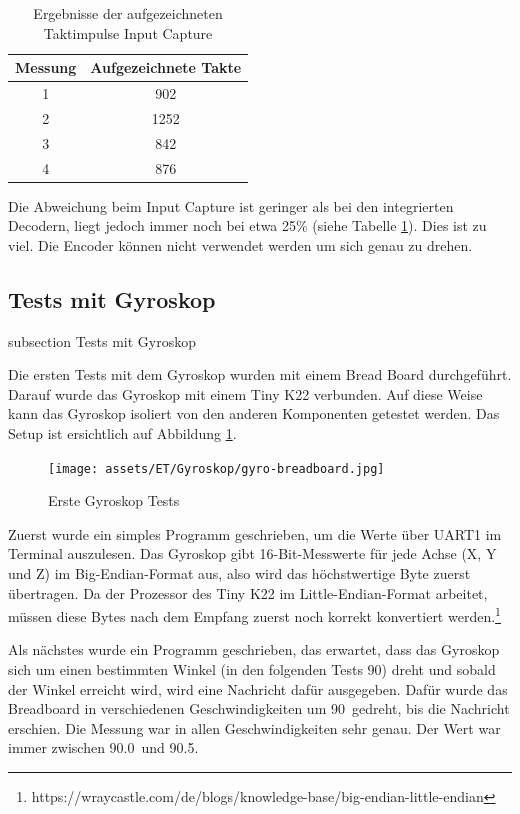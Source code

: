 \begin{table}[H]
\centering
\caption{Ergebnisse der aufgezeichneten Taktimpulse Input Capture}
\label{tab:taktergebnisse_im}
\begin{tabular}{|c|c|}
\hline
\textbf{Messung} & \textbf{Aufgezeichnete Takte} \\
\hline
1 & 902 \\
2 & 1252 \\
3 & 842 \\
4 & 876 \\
\hline
\end{tabular}
\end{table}

Die Abweichung beim Input Capture ist geringer als bei den integrierten Decodern, liegt jedoch immer noch bei etwa 25\% (siehe Tabelle \ref{tab:taktergebnisse_im}). Dies ist zu viel. Die Encoder können nicht verwendet werden um sich genau zu drehen.



\newpage
\subsection*{Tests mit Gyroskop}\label{drehen-gyro}
    {subsection}
    {Tests mit Gyroskop}

Die ersten Tests mit dem Gyroskop wurden mit einem Bread Board durchgeführt. Darauf wurde das Gyroskop mit einem Tiny K22 verbunden. Auf diese Weise kann das Gyroskop isoliert von den anderen Komponenten getestet werden. Das Setup ist ersichtlich auf Abbildung \ref{img:gyro-tests-1}.

\begin{figure}[H]
\centering
\texttt{[image: assets/ET/Gyroskop/gyro-breadboard.jpg]}
\caption{Erste Gyroskop Tests}
\label{img:gyro-tests-1}
\end{figure}

Zuerst wurde ein simples Programm geschrieben, um die Werte über UART1 im Terminal auszulesen. Das Gyroskop gibt 16-Bit-Messwerte für jede Achse (X, Y und Z) im Big-Endian-Format aus, also wird das höchstwertige Byte zuerst übertragen. Da der Prozessor des Tiny K22 im Little-Endian-Format arbeitet, müssen diese Bytes nach dem Empfang zuerst noch korrekt konvertiert werden.\footnote{https://wraycastle.com/de/blogs/knowledge-base/big-endian-little-endian}

Als nächstes wurde ein Programm geschrieben, das erwartet, dass das Gyroskop sich um einen bestimmten Winkel (in den folgenden Tests 90\textdegree) dreht und sobald der Winkel erreicht wird, wird eine Nachricht dafür ausgegeben. Dafür wurde das Breadboard in verschiedenen Geschwindigkeiten um 90\textdegree \ gedreht, bis die Nachricht erschien. Die Messung war in allen Geschwindigkeiten sehr genau. Der Wert war immer zwischen 90.0\textdegree \ und 90.5\textdegree.

